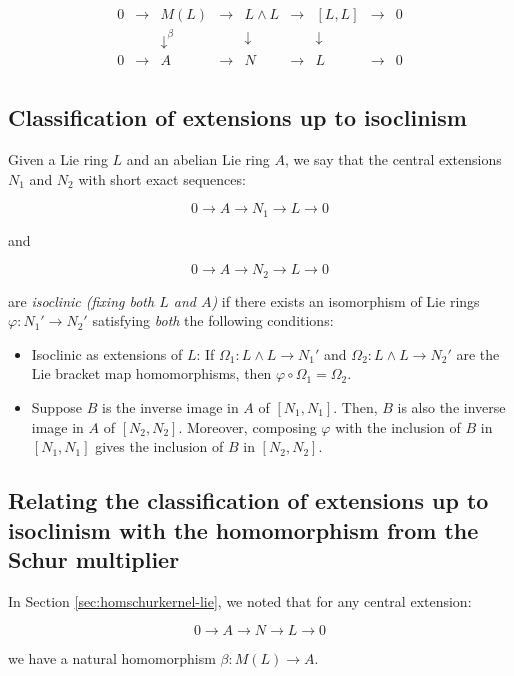 $$\begin{array}{ccccccccc}
0 & \to & M(L) & \to & L \wedge L & \to & [L,L] & \to & 0\\
&&   \downarrow^{\beta}  &&  \downarrow     && \downarrow&& \\
0 & \to & A &\to & N & \to & L & \to & 0\\
\end{array}$$

\subsection{Classification of extensions up to isoclinism}\label{sec:extensionsuptoisoclinism-lie}

Given a Lie ring $L$ and an abelian Lie ring $A$, we say that the central
extensions $N_1$ and $N_2$ with short exact sequences:

$$0 \to A \to N_1 \to L \to 0$$

and

$$0 \to A \to N_2 \to L \to 0$$

are {\em isoclinic (fixing both $L$ and $A$)} if there exists an
isomorphism of Lie rings $\varphi:N_1' \to N_2'$ satisfying {\em both}
the following conditions:

\begin{itemize}
\item Isoclinic as extensions of $L$: If $\Omega_1:L \wedge L \to
  N_1'$ and $\Omega_2:L \wedge L \to N_2'$ are the Lie bracket map
  homomorphisms, then $\varphi \circ \Omega_1 = \Omega_2$.
\item Suppose $B$ is the inverse image in $A$ of $[N_1,N_1]$. Then,
  $B$ is also the inverse image in $A$ of $[N_2,N_2]$. Moreover,
  composing $\varphi$ with the inclusion of $B$ in $[N_1,N_1]$ gives
  the inclusion of $B$ in $[N_2,N_2]$.
\end{itemize}

\subsection{Relating the classification of extensions up to isoclinism with the homomorphism from the Schur multiplier}\label{sec:beta-map-lie}

In Section \ref{sec:homschurkernel-lie}, we noted that for any central extension:

$$0 \to A \to N \to L \to 0$$

we have a natural homomorphism $\beta: M(L) \to A$.

